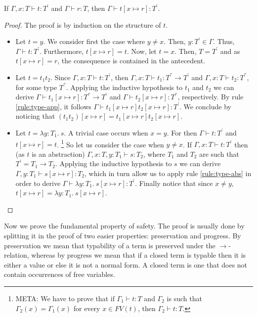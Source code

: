 \begin{lemma}\label{lemma:typeSubs}
If $\Gamma, x: T \vdash t : T^{'}$ and $\Gamma \vdash r : T$, then $\Gamma \vdash t[x \mapsto r] : T^{'}$. 
\end{lemma}
\begin{proof}
The proof is by induction on the structure of $t$. 
\begin{itemize}
\item Let $t = y$. We consider first the case where $y \neq x$. Then, $y : T^{'} \in \Gamma$. Thus, $\Gamma \vdash t : T^{'}$. Furthermore, $t[x \mapsto r] = t$. Now, let $t = x$. Then, $T = T^{'}$ and as $t[x \mapsto r] = r$, the consequence is contained in the antecedent. 
\item Let $t = t_1t_2$.  Since $\Gamma, x : T \vdash t: T^{'}$, then $\Gamma, x:T \vdash t_1: T^{''} \to T^{'}$ and $\Gamma, x:T \vdash t_2 : T^{''}$, for some type $T^{''}$. Applying the inductive hypothesis to $t_1$ and $t_2$ we can derive $\Gamma \vdash t_1[x \mapsto r] : T^{''} \to T^{'}$ and $\Gamma \vdash t_2[x \mapsto r] : T^{''}$, respectively. By rule \eqref{rule:type-app}, it follows $\Gamma \vdash t_1[x \mapsto r]t_2[x \mapsto r] : T^{'}$. We conclude by noticing that $(t_1t_2)[x \mapsto r] = t_1[x \mapsto r]t_2[x \mapsto r]$. 

\item Let $t = \lambda y : T_1 . \ s$. A trivial case occurs when $x = y$. For then $\Gamma \vdash t : T^{'}$ and $t[x \mapsto r] = t$. \footnote{META: We have to prove that if $\Gamma_1 \vdash t: T$ and $\Gamma_2$ is such that $\Gamma_2(x) = \Gamma_1(x)$ for every $x \in FV(t)$, then $\Gamma_2 \vdash t:T$.}  So let us consider the case when $y \neq x$. If $\Gamma, x:T \vdash t : T^{'}$ then (as $t$ is an abstraction) $\Gamma, x:T, y:T_1 \vdash s: T_2$, where $T_1$ and $T_2$ are such that $T^{'} = T_1 \to T_2$. Applying the inductive hypothesis to $s$ we can derive $\Gamma, y:T_1 \vdash s[x \mapsto r]:T_2$, which in turn allow us to apply rule \eqref{rule:type-abs} in order to derive $\Gamma \vdash \lambda y :T_1. \ s[x \mapsto r] : T^{'}$. Finally notice that since $x \neq y$, $t[x \mapsto r] = \lambda y : T_1 . \ s[x \mapsto r]$. 
\end{itemize}
\end{proof}


Now we prove the fundamental property of safety. The proof is usually done by splitting it in the proof of two easier properties: preservation and progress. By preservation we mean that typability of a term is preserved under the $\to$-relation, whereas by progress we mean that if a closed term is typable then it is either a value or else it is not a normal form. A closed term is one that does not contain occurrences of free variables. 

